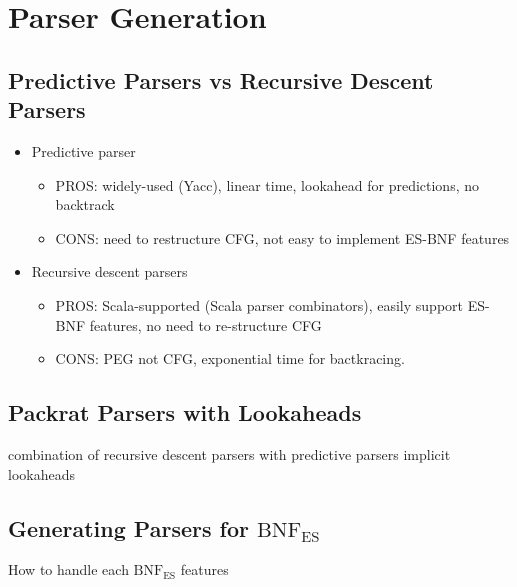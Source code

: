 \section{Parser Generation}

\subsection{Predictive Parsers vs Recursive Descent Parsers}
\begin{itemize}
  \item Predictive parser
    \begin{itemize}
      \item PROS: widely-used (Yacc), linear time, lookahead for predictions, no backtrack
      \item CONS: need to restructure CFG, not easy to implement ES-BNF features
    \end{itemize}
  \item Recursive descent parsers
    \begin{itemize}
      \item PROS: Scala-supported (Scala parser combinators), easily support ES-BNF features, no need to re-structure CFG
      \item CONS: PEG not CFG, exponential time for bactkracing.
    \end{itemize}
\end{itemize}

\subsection{Packrat Parsers with Lookaheads}
combination of recursive descent parsers with predictive parsers
implicit lookaheads

\subsection{Generating Parsers for \( \text{BNF}_\text{ES} \)}
How to handle each \( \text{BNF}_\text{ES} \) features
